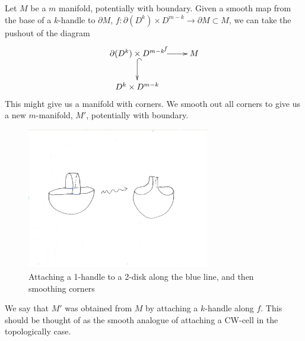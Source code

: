 \documentclass{article}
\newtheorem{proposed work}[theorem]{Proposed Work}
\newcommand{\xymat}[1]{\begin{align*}\xymatrix{ #1}\end{align*}}
\begin{document}
Let $M$ be a $m$ manifold, potentially with boundary. Given a smooth map from the base of a $k$-handle to $\partial M$, $f:\partial(D^k) \times D^{m-k}\to \partial M\subset M$, we can take the pushout of the diagram
\xymat{\partial(D^k) \times D^{m-k} \ar[r]^f \ar@{^{(}->}[d] & M \\ D^k\times D^{m-k} &}
This might give us a manifold with corners. We smooth out all corners to give us a new $m$-manifold, $M'$, potentially with boundary. 
\begin{figure}[h]
\includegraphics[width=8cm]{attach1handle.pdf}
\caption{Attaching a 1-handle to a 2-disk along the blue line, and then smoothing corners\label{attach1handle}}
\end{figure}
We say that $M'$ was obtained from $M$ by attaching a $k$-handle along $f$. This should be thought of as the smooth analogue of attaching a CW-cell in the topologically case.
\end{document}

